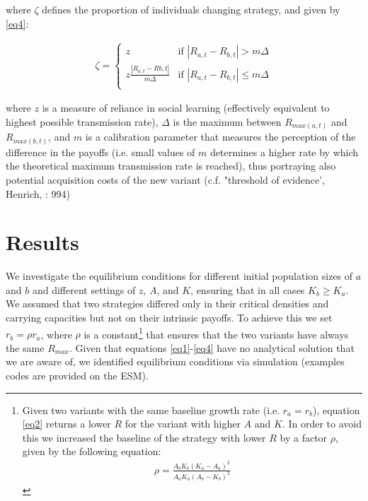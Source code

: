 \documentclass[review,authoryear]{elsarticle}
\begin{document}
where $\zeta$ defines the proportion of individuals changing strategy, and given by \eqref{eq4}:

\begin{equation}
\begin{aligned}
\label{eq4}
\zeta = 
\begin{cases}
z& \text{if }|R_{a,t}-R_{b,t}| > m\Delta\\
z\frac{|R_{a,t}-R{b,t}|}{m\Delta}& \text{if }|R_{a,t}-R_{b,t}| \leq m\Delta\\
\end{cases}
\end{aligned}
\end{equation}

where $z$ is a measure of reliance in social learning (effectively equivalent to highest possible transmission rate), $\Delta$ is the maximum between $R_{max(a,t)}$ and $R_{max(b,t)}$, and $m$ is a calibration parameter that measures the perception of the difference in the payoffs (i.e. small values of $m$ determines a higher rate by which the theoretical maximum transmission rate is reached), thus portraying also potential acquisition costs of the new variant (c.f. "threshold of evidence', Henrich, \citeyear{henrich2001cultural}: 994)

\section{Results}

We investigate the equilibrium conditions for different initial population sizes of $a$ and $b$ and different settings of $z$, $A$, and $K$, ensuring that in all cases $K_b \geq K_a$. We assumed that two strategies differed only in their critical densities and carrying capacities but not on their intrinsic payoffs. To achieve this we set $r_b=\rho r_a$, where $\rho$ is a constant\footnote{Given two variants with the same baseline growth rate (i.e. $r_a=r_b$), equation \eqref{eq2} returns a lower $R$ for the variant with higher $A$ and $K$. In order to avoid this we increased the baseline of the strategy with lower $R$ by a factor $\rho$, given by the following equation:
\begin{align*}
\rho=\frac{A_bK_b(K_a-A_a)^2}{A_aK_a(A_b-K_b)^2}
\end{align*}
  } 
that ensures that the two variants have always the same $R_{max}$. Given that equations \ref{eq1}-\ref{eq4} have no analytical solution that we are aware of, we identified equilibrium conditions via simulation (examples codes are provided on the ESM).
\end{document}
